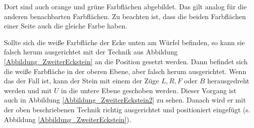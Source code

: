 \documentclass[12pt,a4paper, usenames, dvipsnames]{article}
\theoremstyle{mystyle}
\theoremstyle{definition}
\begin{document}
Dort sind auch orange und grüne Farbflächen abgebildet. Das gilt analog für die anderen benachbarten Farbflächen. Zu beachten ist, dass die beiden Farbflächen einer Seite auch die gleiche Farbe haben.

Sollte sich die weiße Farbfläche der Ecke unten am Würfel befinden, so kann sie falsch herum ausgerichtet mit der Technik aus Abbildung \ref{Abbildung_ZweiterEckstein} an die Position gesetzt werden. Dann befindet sich die weiße Farbfläche in der oberen Ebene, aber falsch herum ausgerichtet. Wenn das der Fall ist, kann der Stein mit einem der Züge $L, R, F$ oder $B$ herausgedreht werden und mit $U$ in die untere Ebene geschoben werden. Dieser Vorgang ist auch in Abbildung \ref{Abbildung_ZweiterEckstein2} zu sehen. Danach wird er mit der oben beschriebenen Technik richtig ausgerichtet und positioniert eingefügt (s. Abbildung \ref{Abbildung_ZweiterEckstein}). 
\end{document}
